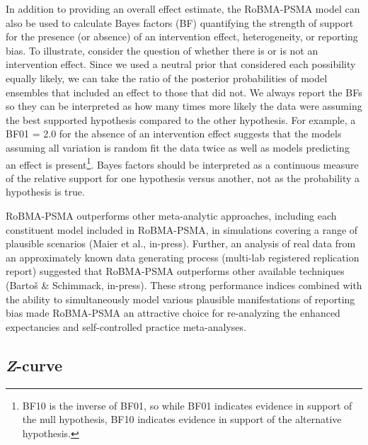 \documentclass[
  doc, donotrepeattitle,floatsintext]{apa7}
\begin{document}
In addition to providing an overall effect estimate, the RoBMA-PSMA model can also be used to calculate Bayes factors (BF) quantifying the strength of support for the presence (or absence) of an intervention effect, heterogeneity, or reporting bias. To illustrate, consider the question of whether there is or is not an intervention effect. Since we used a neutral prior that considered each possibility equally likely, we can take the ratio of the posterior probabilities of model ensembles that included an effect to those that did not. We always report the BFs so they can be interpreted as how many times more likely the data were assuming the best supported hypothesis compared to the other hypothesis. For example, a BF01 = 2.0 for the absence of an intervention effect suggests that the models assuming all variation is random fit the data twice as well as models predicting an effect is present\footnote{BF10 is the inverse of BF01, so while BF01 indicates evidence in support of the null hypothesis, BF10 indicates evidence in support of the alternative hypothesis.}. Bayes factors should be interpreted as a continuous measure of the relative support for one hypothesis versus another, not as the probability a hypothesis is true.

RoBMA-PSMA outperforms other meta-analytic approaches, including each constituent model included in RoBMA-PSMA, in simulations covering a range of plausible scenarios (Maier et al., in-press). Further, an analysis of real data from an approximately known data generating process (multi-lab registered replication report) suggested that RoBMA-PSMA outperforms other available techniques (Bartoš \& Schimmack, in-press). These strong performance indices combined with the ability to simultaneously model various plausible manifestations of reporting bias made RoBMA-PSMA an attractive choice for re-analyzing the enhanced expectancies and self-controlled practice meta-analyses.

\hypertarget{z-curve}{%
\subsection{\texorpdfstring{\emph{Z}-curve}{Z-curve}}\label{z-curve}}
\end{document}
